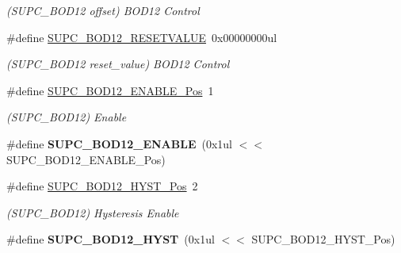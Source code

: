 \begin{DoxyCompactItemize}
\begin{DoxyCompactList}\small\item\em (S\+U\+P\+C\+\_\+\+B\+O\+D12 offset) B\+O\+D12 Control \end{DoxyCompactList}\item 
\hypertarget{group___s_a_m_l21___s_u_p_c_gad9a32d70829e06dcbe33db4bf7f0a93e}{}\#define \hyperlink{group___s_a_m_l21___s_u_p_c_gad9a32d70829e06dcbe33db4bf7f0a93e}{S\+U\+P\+C\+\_\+\+B\+O\+D12\+\_\+\+R\+E\+S\+E\+T\+V\+A\+L\+U\+E}~0x00000000ul\label{group___s_a_m_l21___s_u_p_c_gad9a32d70829e06dcbe33db4bf7f0a93e}

\begin{DoxyCompactList}\small\item\em (S\+U\+P\+C\+\_\+\+B\+O\+D12 reset\+\_\+value) B\+O\+D12 Control \end{DoxyCompactList}\item 
\hypertarget{group___s_a_m_l21___s_u_p_c_ga01ff5ba487c59aff27e3c98506a8bcad}{}\#define \hyperlink{group___s_a_m_l21___s_u_p_c_ga01ff5ba487c59aff27e3c98506a8bcad}{S\+U\+P\+C\+\_\+\+B\+O\+D12\+\_\+\+E\+N\+A\+B\+L\+E\+\_\+\+Pos}~1\label{group___s_a_m_l21___s_u_p_c_ga01ff5ba487c59aff27e3c98506a8bcad}

\begin{DoxyCompactList}\small\item\em (S\+U\+P\+C\+\_\+\+B\+O\+D12) Enable \end{DoxyCompactList}\item 
\hypertarget{group___s_a_m_l21___s_u_p_c_ga4408f27231d844aae8c0785b676d306d}{}\#define {\bfseries S\+U\+P\+C\+\_\+\+B\+O\+D12\+\_\+\+E\+N\+A\+B\+L\+E}~(0x1ul $<$$<$ S\+U\+P\+C\+\_\+\+B\+O\+D12\+\_\+\+E\+N\+A\+B\+L\+E\+\_\+\+Pos)\label{group___s_a_m_l21___s_u_p_c_ga4408f27231d844aae8c0785b676d306d}

\item 
\hypertarget{group___s_a_m_l21___s_u_p_c_ga8098c9f1c2d1dfaac729f3ea8c02953f}{}\#define \hyperlink{group___s_a_m_l21___s_u_p_c_ga8098c9f1c2d1dfaac729f3ea8c02953f}{S\+U\+P\+C\+\_\+\+B\+O\+D12\+\_\+\+H\+Y\+S\+T\+\_\+\+Pos}~2\label{group___s_a_m_l21___s_u_p_c_ga8098c9f1c2d1dfaac729f3ea8c02953f}

\begin{DoxyCompactList}\small\item\em (S\+U\+P\+C\+\_\+\+B\+O\+D12) Hysteresis Enable \end{DoxyCompactList}\item 
\hypertarget{group___s_a_m_l21___s_u_p_c_ga696ff0da867f88c630f64762dbfd1606}{}\#define {\bfseries S\+U\+P\+C\+\_\+\+B\+O\+D12\+\_\+\+H\+Y\+S\+T}~(0x1ul $<$$<$ S\+U\+P\+C\+\_\+\+B\+O\+D12\+\_\+\+H\+Y\+S\+T\+\_\+\+Pos)\label{group___s_a_m_l21___s_u_p_c_ga696ff0da867f88c630f64762dbfd1606}


\end{DoxyCompactItemize}
